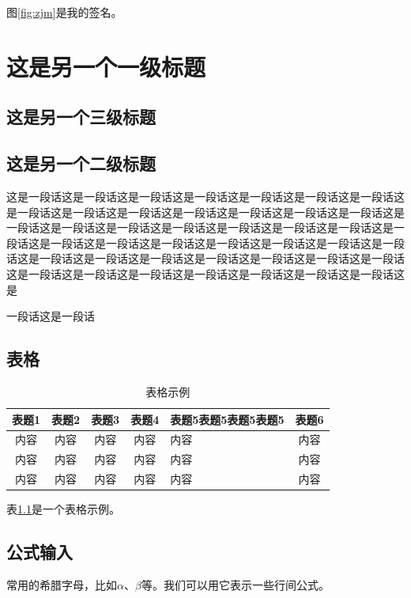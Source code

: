 \documentclass[lang=chs,degree=master,blindreview=true,winfonts=true]{yanputhesis}
\begin{document}
图\ref{fig:zjm}是我的签名。

\chapter{这是另一个一级标题}
\label{sec:org7e2c2b6}
\section{这是另一个三级标题}
\label{sec:org8ab647e}
\section{这是另一个二级标题}
\label{sec:org44dd50f}

这是一段话这是一段话这是一段话这是一段话这是一段话这是一段话这是一段话这是一段话这是一段话这是一段话这是一段话这是一段话这是一段话这是一段话这是一段话这是一段话这是一段话这是一段话这是一段话这是一段话这是一段话这是一段话这是一段话这是一段话这是一段话这是一段话这是一段话这是一段话这是一段话这是一段话这是一段话这是一段话这是一段话这是一段话这是一段话这是一段话这是一段话这是一段话这是一段话这是一段话这是一段话这是一段话这是一段话这是

一段话这是一段话


\section{表格}
\label{sec:org18254ba}
\begin{table}[htbp]
\caption{\label{tab:illus}表格示例}
\centering
\begin{tabular}{c|ccc|>{\centering}m{2cm}|c}
\hline
表题1 & 表题2 & 表题3 & 表题4 & 表题5表题5表题5表题5 & 表题6\\
\hline
内容 & 内容 & 内容 & 内容 & 内容 & 内容\\
内容 & 内容 & 内容 & 内容 & 内容 & 内容\\
内容 & 内容 & 内容 & 内容 & 内容 & 内容\\
\hline
\end{tabular}
\end{table}

表\ref{tab:illus}是一个表格示例。

\section{公式输入}
\label{sec:org2c11b82}

常用的希腊字母，比如\(\alpha\)、\(\beta\)等。我们可以用它表示一些行间公式。
\end{document}
